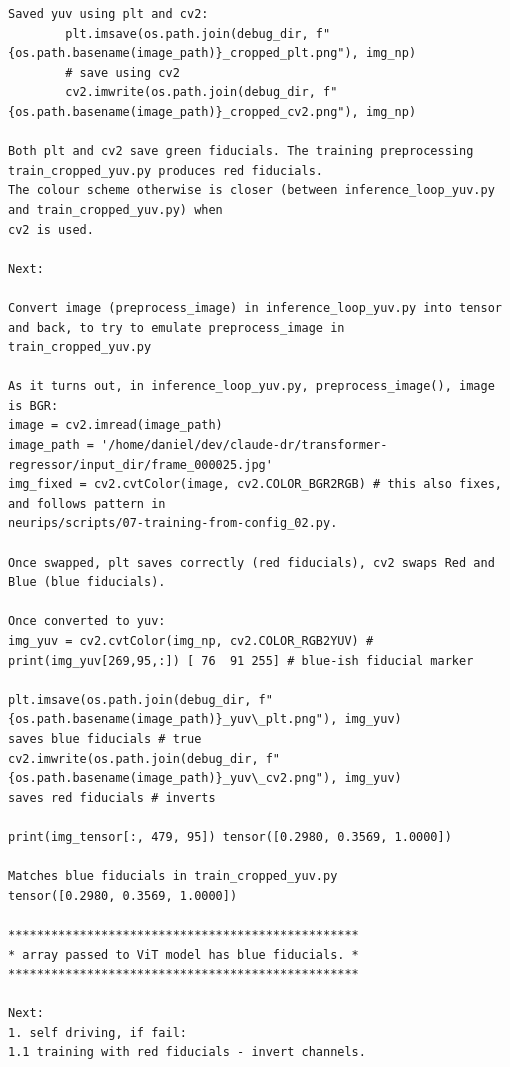 \begin{verbatim}
Saved yuv using plt and cv2:
        plt.imsave(os.path.join(debug_dir, f"{os.path.basename(image_path)}_cropped_plt.png"), img_np)
        # save using cv2
        cv2.imwrite(os.path.join(debug_dir, f"{os.path.basename(image_path)}_cropped_cv2.png"), img_np)

Both plt and cv2 save green fiducials. The training preprocessing train_cropped_yuv.py produces red fiducials.
The colour scheme otherwise is closer (between inference_loop_yuv.py and train_cropped_yuv.py) when
cv2 is used.

Next:

Convert image (preprocess_image) in inference_loop_yuv.py into tensor and back, to try to emulate preprocess_image in
train_cropped_yuv.py

As it turns out, in inference_loop_yuv.py, preprocess_image(), image is BGR:
image = cv2.imread(image_path)
image_path = '/home/daniel/dev/claude-dr/transformer-regressor/input_dir/frame_000025.jpg'
img_fixed = cv2.cvtColor(image, cv2.COLOR_BGR2RGB) # this also fixes, and follows pattern in
neurips/scripts/07-training-from-config_02.py.

Once swapped, plt saves correctly (red fiducials), cv2 swaps Red and Blue (blue fiducials).

Once converted to yuv:
img_yuv = cv2.cvtColor(img_np, cv2.COLOR_RGB2YUV) # print(img_yuv[269,95,:]) [ 76  91 255] # blue-ish fiducial marker

plt.imsave(os.path.join(debug_dir, f"{os.path.basename(image_path)}_yuv\_plt.png"), img_yuv)
saves blue fiducials # true
cv2.imwrite(os.path.join(debug_dir, f"{os.path.basename(image_path)}_yuv\_cv2.png"), img_yuv)
saves red fiducials # inverts

print(img_tensor[:, 479, 95]) tensor([0.2980, 0.3569, 1.0000])

Matches blue fiducials in train_cropped_yuv.py
tensor([0.2980, 0.3569, 1.0000])

*************************************************
* array passed to ViT model has blue fiducials. *
*************************************************

Next:
1. self driving, if fail:
1.1 training with red fiducials - invert channels.

\end{verbatim}

